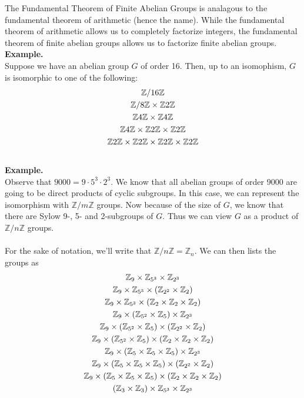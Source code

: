     The Fundamental Theorem of Finite Abelian Groups is
    analagous to the fundamental theorem of arithmetic (hence the
    name). While the fundamental theorem of arithmetic allows us to
    completely factorize integers, the fundamental theorem of finite
    abelian groups allows us to factorize finite abelian groups.
    \\
    \textbf{Example.}
    \\
    Suppose we have an abelian group $G$ of order 16. Then, up to an
    isomophism, $G$ is isomorphic to one of the following:
    \begin{gather*}
        \mathbb{Z}/16\mathbb{Z}\\
        \mathbb{Z}/8\mathbb{Z} \times \mathbb{Z}2\mathbb{Z}\\
        \mathbb{Z}4\mathbb{Z} \times \mathbb{Z}4\mathbb{Z}\\
        \mathbb{Z}4\mathbb{Z} \times \mathbb{Z}2\mathbb{Z} \times \mathbb{Z}2\mathbb{Z}\\
        \mathbb{Z}2\mathbb{Z} \times \mathbb{Z}2\mathbb{Z} \times \mathbb{Z}2\mathbb{Z} \times \mathbb{Z}2\mathbb{Z}
    \end{gather*}
    \\
    \textbf{Example.}
    \\
    Observe that $9000= 9\cdot 5^3 \cdot 2^3$. We know that all abelian groups of order 9000 are going to
    be direct products of cyclic subgroups. In this case, we can
    represent the isomorphism with $\mathbb{Z}/m\mathbb{Z}$ groups.
    Now because of the size of
    $G$, we know that there are Sylow 9-, 5- and 2-subgroups of $G$. Thus
    we can view $G$ as a
    product of $\mathbb{Z}/n\mathbb{Z}$ groups.\\
    \\
    For the sake of
    notation, we'll write that $\mathbb{Z}/n\mathbb{Z} =
    \mathbb{Z}_n$. We can then lists the groups as 
    \setcounter{equation}{0}
    \begin{gather}
        \mathbb{Z}_9 \times \mathbb{Z}_{5^3} \times \mathbb{Z}_{2^3}\\
        \mathbb{Z}_9 \times \mathbb{Z}_{5^3} \times (\mathbb{Z}_{2^2} \times \mathbb{Z}_2)\\
        \mathbb{Z}_9 \times \mathbb{Z}_{5^3} \times (\mathbb{Z}_{2} \times \mathbb{Z}_2 \times \mathbb{Z}_2)\\
        \mathbb{Z}_9 \times (\mathbb{Z}_{5^2} \times \mathbb{Z}_5) \times \mathbb{Z}_{2^3} \\
        \mathbb{Z}_9 \times (\mathbb{Z}_{5^2} \times \mathbb{Z}_5) \times (\mathbb{Z}_{2^2} \times \mathbb{Z}_2)\\
        \mathbb{Z}_9 \times (\mathbb{Z}_{5^2} \times \mathbb{Z}_5) \times (\mathbb{Z}_{2} \times \mathbb{Z}_2 \times \mathbb{Z}_2)\\
        \mathbb{Z}_9 \times (\mathbb{Z}_{5} \times \mathbb{Z}_5 \times \mathbb{Z}_5) \times \mathbb{Z}_{2^3} \\
        \mathbb{Z}_9 \times (\mathbb{Z}_{5} \times \mathbb{Z}_5 \times \mathbb{Z}_5) \times (\mathbb{Z}_{2^2} \times \mathbb{Z}_2)\\
        \mathbb{Z}_9 \times (\mathbb{Z}_{5} \times \mathbb{Z}_5 \times \mathbb{Z}_5) \times (\mathbb{Z}_{2} \times \mathbb{Z}_2 \times \mathbb{Z}_2)\\
        (\mathbb{Z}_3 \times \mathbb{Z}_3) \times \mathbb{Z}_{5^3} \times \mathbb{Z}_{2^3}
    \end{gather}
